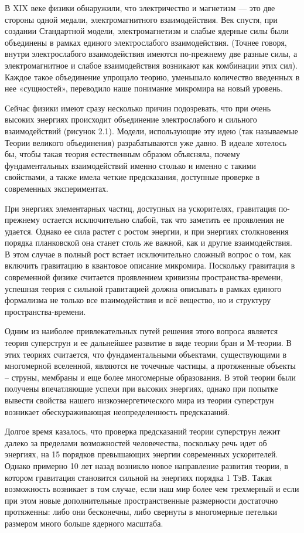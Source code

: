 В XIX веке физики обнаружили, что электричество и магнетизм — это две стороны одной медали, электромагнитного взаимодействия. Век спустя, при создании Стандартной модели, электромагнетизм и слабые ядерные силы были объединены в рамках единого электрослабого взаимодействия. (Точнее говоря, внутри электрослабого взаимодействия имеются по-прежнему две разные силы, а электромагнитное и слабое взаимодействия возникают как комбинации этих сил). Каждое такое объединение упрощало теорию, уменьшало количество введенных в нее «сущностей», переводило наше понимание микромира на новый уровень.

Сейчас физики имеют сразу несколько причин подозревать, что при очень высоких энергиях происходит объединение электрослабого и сильного взаимодействий (рисунок 2.1). Модели, использующие эту идею (так называемые Теории великого объединения) разрабатываются уже давно. В идеале хотелось бы, чтобы такая теория естественным образом объясняла, почему фундаментальных взаимодействий именно столько и именно с такими свойствами, а также имела четкие предсказания, доступные проверке в современных экспериментах.

При энергиях элементарных частиц, доступных на ускорителях, гравитация по-прежнему остается исключительно слабой, так что заметить ее проявления не удается. Однако ее сила растет с ростом энергии, и при энергиях столкновения порядка планковской она станет столь же важной, как и другие взаимодействия. В этом случае в полный рост встает исключительно сложный вопрос о том, как включить гравитацию в квантовое описание микромира. Поскольку гравитация в современной физике считается проявлением кривизны пространства-времени, успешная теория с сильной гравитацией должна описывать в рамках единого формализма не только все взаимодействия и всё вещество, но и структуру пространства-времени.

Одним из наиболее привлекательных путей решения этого вопроса является теория суперструн и ее дальнейшее развитие в виде теории бран и М-теории. В этих теориях считается, что фундаментальными объектами, существующими в многомерной вселенной, являются не точечные частицы, а протяженные объекты -- струны, мембраны и еще более многомерные образования. В этой теории были получены впечатляющие успехи при высоких энергиях, однако при попытке вывести свойства нашего низкоэнергетического мира из теории суперструн возникает обескураживающая неопределенность предсказаний.

Долгое время казалось, что проверка предсказаний теории суперструн лежит далеко за пределами возможностей человечества, поскольку речь идет об энергиях, на 15 порядков превышающих энергии современных ускорителей. Однако примерно 10 лет назад возникло новое направление развития теории, в котором гравитация становится сильной на энергиях порядка 1 ТэВ. Такая возможность возникает в том случае, если наш мир более чем трехмерный и если при этом новые дополнительные пространственные размерности достаточно протяженны: либо они бесконечны, либо свернуты в многомерные петельки размером много больше ядерного масштаба.

